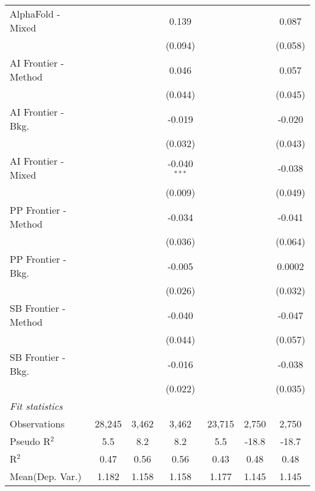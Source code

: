 \begin{tabular}{lcccccc}
   AlphaFold - Mixed    &               &             & 0.139          &               &               & 0.087\\   
                        &               &             & (0.094)        &               &               & (0.058)\\   
   AI Frontier - Method &               &             & 0.046          &               &               & 0.057\\   
                        &               &             & (0.044)        &               &               & (0.045)\\   
   AI Frontier - Bkg.   &               &             & -0.019         &               &               & -0.020\\   
                        &               &             & (0.032)        &               &               & (0.043)\\   
   AI Frontier - Mixed  &               &             & -0.040$^{***}$ &               &               & -0.038\\   
                        &               &             & (0.009)        &               &               & (0.049)\\   
   PP Frontier - Method &               &             & -0.034         &               &               & -0.041\\   
                        &               &             & (0.036)        &               &               & (0.064)\\   
   PP Frontier - Bkg.   &               &             & -0.005         &               &               & 0.0002\\   
                        &               &             & (0.026)        &               &               & (0.032)\\   
   SB Frontier - Method &               &             & -0.040         &               &               & -0.047\\   
                        &               &             & (0.044)        &               &               & (0.057)\\   
   SB Frontier - Bkg.   &               &             & -0.016         &               &               & -0.038\\   
                        &               &             & (0.022)        &               &               & (0.035)\\   
   \midrule
   \emph{Fit statistics}\\
   Observations         & 28,245        & 3,462       & 3,462          & 23,715        & 2,750         & 2,750\\  
   Pseudo R$^2$         & 5.5           & 8.2         & 8.2            & 5.5           & -18.8         & -18.7\\  
   R$^2$                & 0.47          & 0.56        & 0.56           & 0.43          & 0.48          & 0.48\\  
Mean(Dep. Var.) & 1.182 & 1.158 & 1.158 & 1.177 & 1.145 & 1.145 \\
   

\end{tabular}
